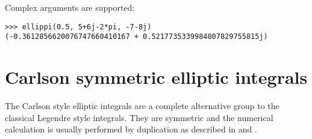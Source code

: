 Complex arguments are supported:

\begin{lstlisting}
>>> ellippi(0.5, 5+6j-2*pi, -7-8j)
(-0.3612856620076747660410167 + 0.5217735339984807829755815j)
\end{lstlisting}





\newpage
\section{Carlson symmetric elliptic integrals}


The Carlson style elliptic integrals are a complete alternative group to the classical
Legendre style integrals. They are symmetric and the numerical calculation is usually
performed by duplication as described in  \cite{Carlson_1994} and  \cite{Carlson_1995}.
%
%
%
%
%
%
%
